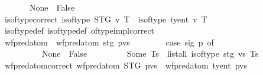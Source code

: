 \begin{isabellebody}
\ \ \ \ \ \ {\isacharbar}{\kern0pt}\ None\ {\isasymRightarrow}\ False{\isacharparenright}{\kern0pt}{\isachardoublequoteclose}\isanewline
\isanewline
\ \ \ \ \isamarkupfalse%
\ is{\isacharunderscore}{\kern0pt}of{\isacharunderscore}{\kern0pt}type{\isacharprime}{\kern0pt}{\isacharunderscore}{\kern0pt}correct{\isacharcolon}{\kern0pt}\ {\isachardoublequoteopen}is{\isacharunderscore}{\kern0pt}of{\isacharunderscore}{\kern0pt}type{\isacharprime}{\kern0pt}\ STG\ v\ T\ {\isacharequal}{\kern0pt}\ is{\isacharunderscore}{\kern0pt}of{\isacharunderscore}{\kern0pt}type\ ty{\isacharunderscore}{\kern0pt}ent\ v\ T{\isachardoublequoteclose}\isanewline
%
\isadelimproof
\ \ \ \ \ \ %
\endisadelimproof
%
\isatagproof
{}\isamarkupfalse%
\ is{\isacharunderscore}{\kern0pt}of{\isacharunderscore}{\kern0pt}type{\isacharprime}{\kern0pt}{\isacharunderscore}{\kern0pt}def\ is{\isacharunderscore}{\kern0pt}of{\isacharunderscore}{\kern0pt}type{\isacharunderscore}{\kern0pt}def\ of{\isacharunderscore}{\kern0pt}type{\isacharunderscore}{\kern0pt}impl{\isacharunderscore}{\kern0pt}correct\ \isakeywordONE{{\isachardot}{\kern0pt}{\isachardot}{\kern0pt}}\isamarkupfalse%
%
\endisatagproof
{\isafoldproof}%
%
\isadelimproof
\isanewline
%
\endisadelimproof
\isanewline
\ \ \ \ \isamarkupfalse%
\ wf{\isacharunderscore}{\kern0pt}pred{\isacharunderscore}{\kern0pt}atom{\isacharprime}{\kern0pt}\ \ {\isachardoublequoteopen}wf{\isacharunderscore}{\kern0pt}pred{\isacharunderscore}{\kern0pt}atom{\isacharprime}{\kern0pt}\ stg\ {\isacharparenleft}{\kern0pt}p{\isacharcomma}{\kern0pt}vs{\isacharparenright}{\kern0pt}\ {\isasymlongleftrightarrow}\ \isanewline
\ \ \ \ \ \ {\isacharparenleft}{\kern0pt}case\ sig\ p\ of\isanewline
\ \ \ \ \ \ \ \ \ \ None\ {\isasymRightarrow}\ False\isanewline
\ \ \ \ \ \ \ \ {\isacharbar}{\kern0pt}\ Some\ Ts\ {\isasymRightarrow}\ list{\isacharunderscore}{\kern0pt}all{}\ {\isacharparenleft}{\kern0pt}is{\isacharunderscore}{\kern0pt}of{\isacharunderscore}{\kern0pt}type{\isacharprime}{\kern0pt}\ stg{\isacharparenright}{\kern0pt}\ vs\ Ts{\isacharparenright}{\kern0pt}{\isachardoublequoteclose}\isanewline
\isanewline
\ \ \ \ \isamarkupfalse%
\ wf{\isacharunderscore}{\kern0pt}pred{\isacharunderscore}{\kern0pt}atom{\isacharprime}{\kern0pt}{\isacharunderscore}{\kern0pt}correct{\isacharcolon}{\kern0pt}\ {\isachardoublequoteopen}wf{\isacharunderscore}{\kern0pt}pred{\isacharunderscore}{\kern0pt}atom{\isacharprime}{\kern0pt}\ STG\ pvs\ {\isacharequal}{\kern0pt}\ wf{\isacharunderscore}{\kern0pt}pred{\isacharunderscore}{\kern0pt}atom\ ty{\isacharunderscore}{\kern0pt}ent\ pvs{\isachardoublequoteclose}\isanewline

\end{isabellebody}
